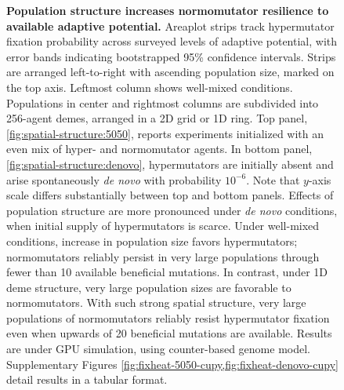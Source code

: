 \begin{figure}[h]
  \begin{minipage}{\textwidth}
    \caption{%
      \textbf{Population structure increases normomutator resilience to available adaptive potential.}
      \footnotesize
      Areaplot strips track hypermutator fixation probability across surveyed levels of adaptive potential, with error bands indicating bootstrapped 95\% confidence intervals.
      Strips are arranged left-to-right with ascending population size, marked on the top axis.
      Leftmost column shows well-mixed conditions.
      Populations in center and rightmost columns are subdivided into 256-agent demes, arranged in a 2D grid or 1D ring.
      Top panel, \ref{fig:spatial-structure:5050}, reports experiments initialized with an even mix of hyper- and normomutator agents.
      In bottom panel, \ref{fig:spatial-structure:denovo}, hypermutators are initially absent and arise spontaneously \textit{de novo} with probability $10^{-6}$.
      Note that $y$-axis scale differs substantially between top and bottom panels.
      Effects of population structure are more pronounced under \textit{de novo} conditions, when initial supply of hypermutators is scarce.
      Under well-mixed conditions, increase in population size favors hypermutators; normomutators reliably persist in very large populations through fewer than 10 available beneficial mutations.
      In contrast, under 1D deme structure, very large population sizes are favorable to normomutators.
      With such strong spatial structure, very large populations of normomutators reliably resist hypermutator fixation even when upwards of 20 beneficial mutations are available.
      Results are under GPU simulation, using counter-based genome model.
      Supplementary Figures \cref{fig:fixheat-5050-cupy,fig:fixheat-denovo-cupy} detail results in a tabular format.
    }
    \label{fig:spatial-structure}
  \end{minipage}
\end{figure}
